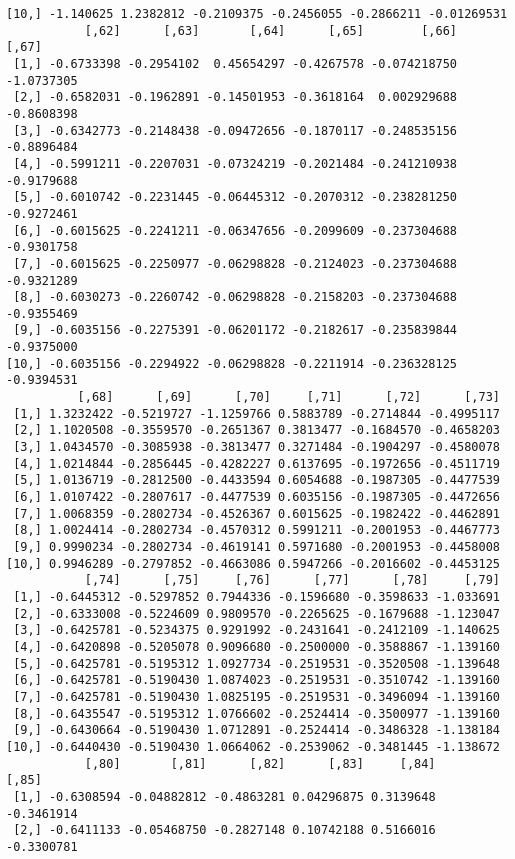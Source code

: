 \documentclass[
  letterpaper,
  DIV=11,
  numbers=noendperiod]{scrreprt}
\begin{document}
\begin{verbatim}
[10,] -1.140625 1.2382812 -0.2109375 -0.2456055 -0.2866211 -0.01269531
           [,62]      [,63]       [,64]      [,65]        [,66]      [,67]
 [1,] -0.6733398 -0.2954102  0.45654297 -0.4267578 -0.074218750 -1.0737305
 [2,] -0.6582031 -0.1962891 -0.14501953 -0.3618164  0.002929688 -0.8608398
 [3,] -0.6342773 -0.2148438 -0.09472656 -0.1870117 -0.248535156 -0.8896484
 [4,] -0.5991211 -0.2207031 -0.07324219 -0.2021484 -0.241210938 -0.9179688
 [5,] -0.6010742 -0.2231445 -0.06445312 -0.2070312 -0.238281250 -0.9272461
 [6,] -0.6015625 -0.2241211 -0.06347656 -0.2099609 -0.237304688 -0.9301758
 [7,] -0.6015625 -0.2250977 -0.06298828 -0.2124023 -0.237304688 -0.9321289
 [8,] -0.6030273 -0.2260742 -0.06298828 -0.2158203 -0.237304688 -0.9355469
 [9,] -0.6035156 -0.2275391 -0.06201172 -0.2182617 -0.235839844 -0.9375000
[10,] -0.6035156 -0.2294922 -0.06298828 -0.2211914 -0.236328125 -0.9394531
          [,68]      [,69]      [,70]     [,71]      [,72]      [,73]
 [1,] 1.3232422 -0.5219727 -1.1259766 0.5883789 -0.2714844 -0.4995117
 [2,] 1.1020508 -0.3559570 -0.2651367 0.3813477 -0.1684570 -0.4658203
 [3,] 1.0434570 -0.3085938 -0.3813477 0.3271484 -0.1904297 -0.4580078
 [4,] 1.0214844 -0.2856445 -0.4282227 0.6137695 -0.1972656 -0.4511719
 [5,] 1.0136719 -0.2812500 -0.4433594 0.6054688 -0.1987305 -0.4477539
 [6,] 1.0107422 -0.2807617 -0.4477539 0.6035156 -0.1987305 -0.4472656
 [7,] 1.0068359 -0.2802734 -0.4526367 0.6015625 -0.1982422 -0.4462891
 [8,] 1.0024414 -0.2802734 -0.4570312 0.5991211 -0.2001953 -0.4467773
 [9,] 0.9990234 -0.2802734 -0.4619141 0.5971680 -0.2001953 -0.4458008
[10,] 0.9946289 -0.2797852 -0.4663086 0.5947266 -0.2016602 -0.4453125
           [,74]      [,75]     [,76]      [,77]      [,78]     [,79]
 [1,] -0.6445312 -0.5297852 0.7944336 -0.1596680 -0.3598633 -1.033691
 [2,] -0.6333008 -0.5224609 0.9809570 -0.2265625 -0.1679688 -1.123047
 [3,] -0.6425781 -0.5234375 0.9291992 -0.2431641 -0.2412109 -1.140625
 [4,] -0.6420898 -0.5205078 0.9096680 -0.2500000 -0.3588867 -1.139160
 [5,] -0.6425781 -0.5195312 1.0927734 -0.2519531 -0.3520508 -1.139648
 [6,] -0.6425781 -0.5190430 1.0874023 -0.2519531 -0.3510742 -1.139160
 [7,] -0.6425781 -0.5190430 1.0825195 -0.2519531 -0.3496094 -1.139160
 [8,] -0.6435547 -0.5195312 1.0766602 -0.2524414 -0.3500977 -1.139160
 [9,] -0.6430664 -0.5190430 1.0712891 -0.2524414 -0.3486328 -1.138184
[10,] -0.6440430 -0.5190430 1.0664062 -0.2539062 -0.3481445 -1.138672
           [,80]       [,81]      [,82]      [,83]     [,84]      [,85]
 [1,] -0.6308594 -0.04882812 -0.4863281 0.04296875 0.3139648 -0.3461914
 [2,] -0.6411133 -0.05468750 -0.2827148 0.10742188 0.5166016 -0.3300781

\end{verbatim}
\end{document}
